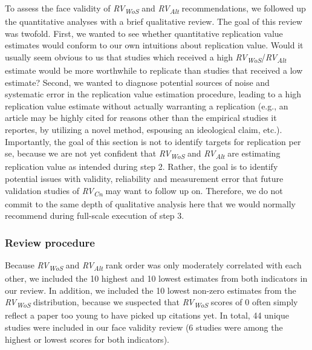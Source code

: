 \documentclass[
  english,
  man,floatsintext]{apa6}
\begin{document}
To assess the face validity of \emph{RV\textsubscript{WoS}} and \emph{RV\textsubscript{Alt}} recommendations, we followed up the quantitative analyses with a brief qualitative review. The goal of this review was twofold. First, we wanted to see whether quantitative replication value estimates would conform to our own intuitions about replication value. Would it usually seem obvious to us that studies which received a high \emph{RV\textsubscript{WoS}}/\emph{RV\textsubscript{Alt}} estimate would be more worthwhile to replicate than studies that received a low estimate? Second, we wanted to diagnose potential sources of noise and systematic error in the replication value estimation procedure, leading to a high replication value estimate without actually warranting a replication (e.g., an article may be highly cited for reasons other than the empirical studies it reportes, by utilizing a novel method, espousing an ideological claim, etc.). Importantly, the goal of this section is not to identify targets for replication per se, because we are not yet confident that \emph{RV\textsubscript{WoS}} and \emph{RV\textsubscript{Alt}} are estimating replication value as intended during step 2. Rather, the goal is to identify potential issues with validity, reliability and measurement error that future validation studies of \emph{RV\textsubscript{Cn}} may want to follow up on. Therefore, we do not commit to the same depth of qualitative analysis here that we would normally recommend during full-scale execution of step 3.

\hypertarget{review-procedure}{%
\subsubsection{Review procedure}\label{review-procedure}}

Because \emph{RV\textsubscript{WoS}} and \emph{RV\textsubscript{Alt}} rank order was only moderately correlated with each other, we included the 10 highest and 10 lowest estimates from both indicators in our review. In addition, we included the 10 lowest non-zero estimates from the \emph{RV\textsubscript{WoS}} distribution, because we suspected that \emph{RV\textsubscript{WoS}} scores of 0 often simply reflect a paper too young to have picked up citations yet. In total, 44 unique studies were included in our face validity review (6 studies were among the highest or lowest scores for both indicators).
\end{document}
